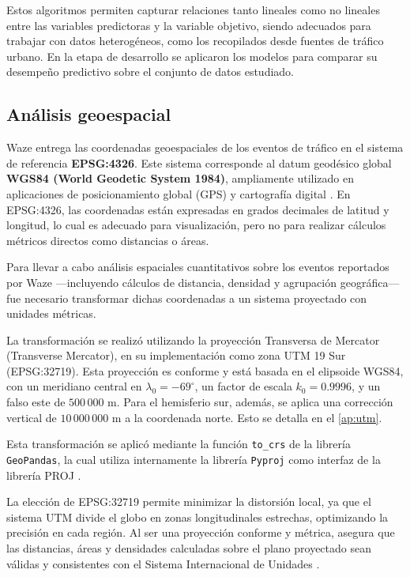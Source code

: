 \documentclass[12pt]{article}
\begin{document}
Estos algoritmos permiten capturar relaciones tanto lineales como no lineales entre las variables predictoras y la variable objetivo, siendo adecuados para trabajar con datos heterogéneos, como los recopilados desde fuentes de tráfico urbano. En la etapa de desarrollo se aplicaron los modelos para comparar su desempeño predictivo sobre el conjunto de datos estudiado.

\subsection{Análisis geoespacial}

Waze entrega las coordenadas geoespaciales de los eventos de tráfico en el sistema de referencia \textbf{EPSG:4326}. Este sistema corresponde al datum geodésico global \textbf{WGS84 (World Geodetic System 1984)}, ampliamente utilizado en aplicaciones de posicionamiento global (GPS) y cartografía digital \parencite{epsg4326, wgs84_nima}. En EPSG:4326, las coordenadas están expresadas en grados decimales de latitud y longitud, lo cual es adecuado para visualización, pero no para realizar cálculos métricos directos como distancias o áreas.

Para llevar a cabo análisis espaciales cuantitativos sobre los eventos reportados por Waze —incluyendo cálculos de distancia, densidad y agrupación geográfica— fue necesario transformar dichas coordenadas a un sistema proyectado con unidades métricas.

La transformación se realizó utilizando la proyección Transversa de Mercator (Transverse Mercator), en su implementación como zona UTM 19 Sur (EPSG:32719). Esta proyección es conforme y está basada en el elipsoide WGS84, con un meridiano central en $\lambda_0 = -69^\circ$, un factor de escala $k_0 = 0.9996$, y un falso este de $500\,000$ m. Para el hemisferio sur, además, se aplica una corrección vertical de $10\,000\,000$ m a la coordenada norte. Esto se detalla en el \autoref{ap:utm}.

Esta transformación se aplicó mediante la función \texttt{to\_crs} de la librería \texttt{GeoPandas}, la cual utiliza internamente la librería \texttt{Pyproj} como interfaz de la librería PROJ \parencite{gdal_proj, pyproj, geopandas}.

La elección de EPSG:32719 permite minimizar la distorsión local, ya que el sistema UTM divide el globo en zonas longitudinales estrechas, optimizando la precisión en cada región. Al ser una proyección conforme y métrica, asegura que las distancias, áreas y densidades calculadas sobre el plano proyectado sean válidas y consistentes con el Sistema Internacional de Unidades \parencite{epsg32719}.
\end{document}

